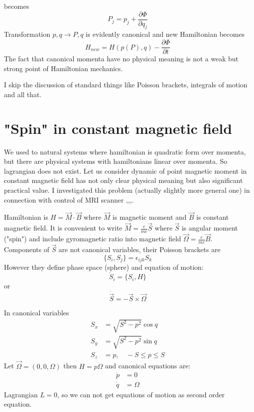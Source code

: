 becomes \[ P_j=p_j+\frac{\partial \Phi}{\partial q_j} \] Transformation $ p,q \rightarrow P,q $ is evidently
canonical and new Hamiltonian becomes 
\[ H_{new}=H(p(P),q)- \frac{\partial \Phi}{\partial t}\]
The fact that canonical momenta have no physical meaning is not a weak but strong point of Hamiltonian 
mechanics.

I skip the  discussion of standard things like Poisson brackets, integrals of motion and all that.

\section{"Spin" in constant magnetic field}
\label{mag-mom}
We used to natural systems where hamiltonian is quadratic form over momenta,
but there are physical systems with hamiltonians linear over momenta.
So lagrangian does not exist. Let us consider 
dynamic of point magnetic moment in constant magnetic field has not only
clear physical meaning but also significant practical value. I investigated
this problem (actually slightly more general one) in connection with control of MRI
scanner \cite{RPZ4},\cite{RPZ3},\cite{RPZ2},\cite{RPZ1}.


Hamiltonian is $ H=\vec M \cdot \vec B $ where $\vec M$ is magnetic moment 
and $ \vec B $ is constant magnetic field.
It is convenient to write $ \vec M=\frac{e}{m c}\vec S $ where $ \vec S $
is angular moment ("spin")  and  include gyromagnetic ratio into magnetic field
$ \vec \Omega = \frac{e}{m c}\vec B$. Components of $ \vec S $ are not
canonical variables, their Poisson brackets are
\begin{equation}
   \label {pb}
    \{S_i,S_j\}= \epsilon_{ijk} S_k
\end{equation}
However they define phase space (sphere)  and equation of motion:
\begin{equation}
   \label {sp1}
    \dot S_i=\{S_i,H\}
\end{equation} 
or 
\begin{equation}
   \label {sp2}
    \dot {\vec S} =-\vec S \times \vec \Omega
\end{equation}

In canonical variables 
\begin{equation}
   \label {sp3}
   \begin{split}
       S_x & = \sqrt{S^2-p^2} \cos q \\
       S_y & = \sqrt{S^2-p^2} \sin q \\
       S_z & = p,\quad -S\le p \le S
   \end{split}
\end{equation}
Let $ \vec \Omega =(0,0, \Omega) $ then $ H=p \Omega $ and canonical equations are:
\begin{equation}
   \label {sp4}
   \begin{split}
       \dot p & =0\\
       \dot q & = \Omega
   \end{split}
\end{equation}
Lagrangian $ L=0 $, so we can not get equations of motion as second order equation.

